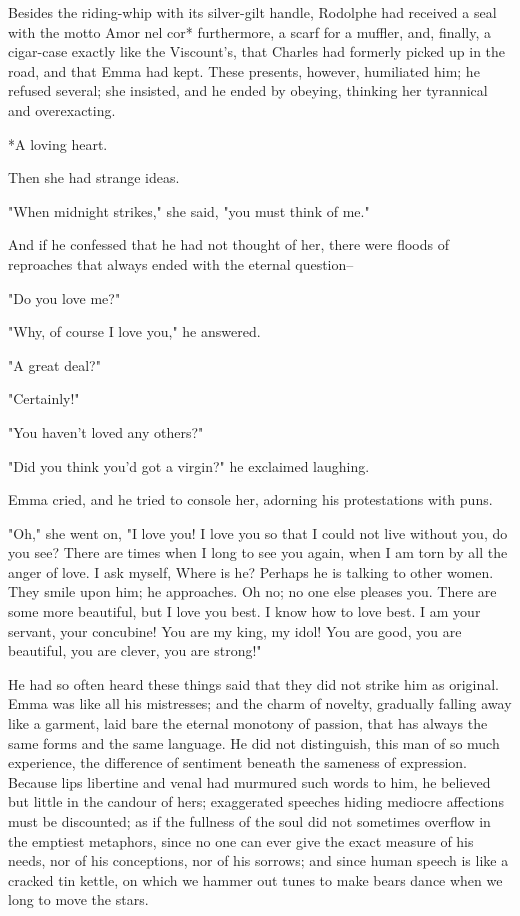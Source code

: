 \documentclass[11pt,twocolumn]{ltugboat}
\begin{document}
Besides the riding-whip with its silver-gilt handle, Rodolphe had
received a seal with the motto Amor nel cor* furthermore, a scarf for
a muffler, and, finally, a cigar-case exactly like the Viscount's, that
Charles had formerly picked up in the road, and that Emma had kept.
These presents, however, humiliated him; he refused several; she
insisted, and he ended by obeying, thinking her tyrannical and
overexacting.

     *A loving heart.

Then she had strange ideas.

"When midnight strikes," she said, "you must think of me."

And if he confessed that he had not thought of her, there were floods of
reproaches that always ended with the eternal question--

"Do you love me?"

"Why, of course I love you," he answered.

"A great deal?"

"Certainly!"

"You haven't loved any others?"

"Did you think you'd got a virgin?" he exclaimed laughing.

Emma cried, and he tried to console her, adorning his protestations with
puns.

"Oh," she went on, "I love you! I love you so that I could not live
without you, do you see? There are times when I long to see you again,
when I am torn by all the anger of love. I ask myself, Where is
he? Perhaps he is talking to other women. They smile upon him; he
approaches. Oh no; no one else pleases you. There are some more
beautiful, but I love you best. I know how to love best. I am your
servant, your concubine! You are my king, my idol! You are good, you are
beautiful, you are clever, you are strong!"

He had so often heard these things said that they did not strike him as
original. Emma was like all his mistresses; and the charm of novelty,
gradually falling away like a garment, laid bare the eternal monotony
of passion, that has always the same forms and the same language. He
did not distinguish, this man of so much experience, the difference of
sentiment beneath the sameness of expression. Because lips libertine
and venal had murmured such words to him, he believed but little in the
candour of hers; exaggerated speeches hiding mediocre affections must be
discounted; as if the fullness of the soul did not sometimes overflow in
the emptiest metaphors, since no one can ever give the exact measure of
his needs, nor of his conceptions, nor of his sorrows; and since human
speech is like a cracked tin kettle, on which we hammer out tunes to
make bears dance when we long to move the stars.
\end{document}
